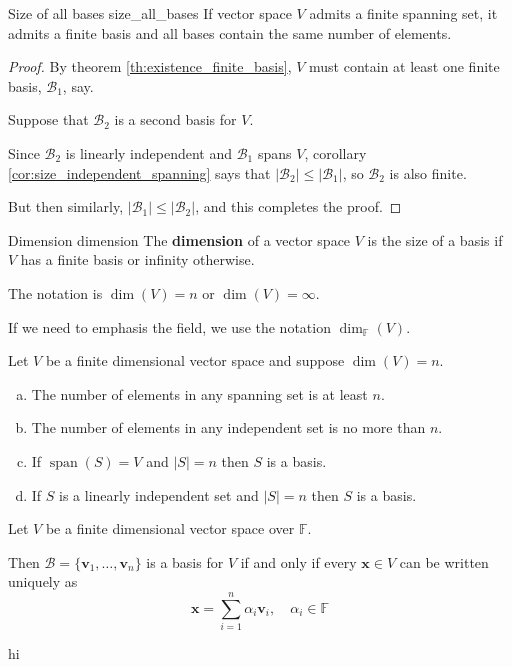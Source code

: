 \begin{theorem}{Size of all bases \cite{math2601_notes}}{size_all_bases}
If vector space $V$ admits a finite spanning set, it admits a finite basis and all bases contain the same number of elements.

\begin{proof}
By theorem \ref{th:existence_finite_basis}, $V$ must contain at least one finite basis, $\mathcal{B}_1$, say.

Suppose that $\mathcal{B}_2$ is a second basis for $V$.

Since $\mathcal{B}_2$ is linearly independent and $\mathcal{B}_1$ spans $V$, corollary \ref{cor:size_independent_spanning} says that $\lvert \mathcal{B}_2 \rvert \leq \lvert \mathcal{B}_1 \rvert$, so $\mathcal{B}_2$ is also finite.

But then similarly, $\lvert \mathcal{B}_1 \rvert \leq \lvert \mathcal{B}_2 \rvert$, and this completes the proof.
\end{proof}
\end{theorem}

\begin{definition}{Dimension \cite{math2601_notes}}{dimension}
The \textbf{dimension} of a vector space $V$ is the size of a basis if $V$ has a finite basis or infinity otherwise.

The notation is $\dim (V) = n$ or $\dim(V) = \infty$.

If we need to emphasis the field, we use the notation $\dim_\mathbb{F}(V)$.
\end{definition}

\begin{lemma}{\cite{math2601_notes}}{}
Let $V$ be a finite dimensional vector space and suppose $\dim (V) = n$.
\begin{enumerate}[a)]
	\item The number of elements in any spanning set is at least $n$.
	\item The number of elements in any independent set is no more than $n$.
	\item If $\operatorname{span} (S) = V$ and $\lvert S \rvert = n$ then $S$ is a basis.
	\item If $S$ is a linearly independent set and $\lvert S \rvert = n$ then $S$ is a basis.
\end{enumerate}
\end{lemma}

\begin{theorem}{}{}
Let $V$ be a finite dimensional vector space over $\mathbb{F}$.

Then $\mathcal{B} = \{ \mathbf{v}_1, \ldots, \mathbf{v}_n \}$ is a basis for $V$ if and only if every $\mathbf{x} \in V$ can be written uniquely as
$$ \mathbf{x} = \sum_{i = 1}^{n} \alpha_i \mathbf{v}_i, \quad \alpha_i \in \mathbb{F} $$
\end{theorem}

hi
